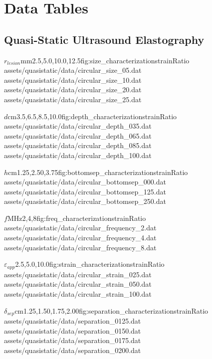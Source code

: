 \chapter{Data Tables}
\label{app:data_tables}
	\renewcommand{\arraystretch}{0.5}

	\section{Quasi-Static Ultrasound Elastography}
	\label{appsec:dt_quasi}
		\begin{multicols*}{2}
			\characterizationDataTable%
				{$r_{lesion}$}{mm}{2.5,5.0,10.0,12.5}{fig:size_characterization}{strainRatio}%
				{assets/quasistatic/data/circular_size_05.dat}%
				{assets/quasistatic/data/circular_size_10.dat}%
				{assets/quasistatic/data/circular_size_20.dat}%
				{assets/quasistatic/data/circular_size_25.dat}

			\characterizationDataTable%
				{$d$}{cm}{3.5,6.5,8.5,10.0}{fig:depth_characterization}{strainRatio}%
				{assets/quasistatic/data/circular_depth_035.dat}%
				{assets/quasistatic/data/circular_depth_065.dat}%
				{assets/quasistatic/data/circular_depth_085.dat}%
				{assets/quasistatic/data/circular_depth_100.dat}

			\characterizationDataTable%
				{$h$}{cm}{1.25,2.50,3.75}{fig:bottomsep_characterization}{strainRatio}%
				{assets/quasistatic/data/circular_bottomsep_000.dat}%
				{assets/quasistatic/data/circular_bottomsep_125.dat}%
				{assets/quasistatic/data/circular_bottomsep_250.dat}%
				{}

			\characterizationDataTable%
				{$f$}{MHz}{2,4,8}{fig:freq_characterization}{strainRatio}%
				{assets/quasistatic/data/circular_frequency_2.dat}%
				{assets/quasistatic/data/circular_frequency_4.dat}%
				{assets/quasistatic/data/circular_frequency_8.dat}%
				{}

			\characterizationDataTable%
				{$\varepsilon_{app}$}{\percent}{2.5,5.0,10.0}{fig:strain_characterization}{strainRatio}%
				{assets/quasistatic/data/circular_strain_025.dat}%
				{assets/quasistatic/data/circular_strain_050.dat}%
				{assets/quasistatic/data/circular_strain_100.dat}%
				{}

			\characterizationDataTable%
				{$\delta_{sep}$}{cm}{1.25,1.50,1.75,2.00}{fig:separation_characterization}{strainRatio}%
				{assets/quasistatic/data/separation_0125.dat}%
				{assets/quasistatic/data/separation_0150.dat}%
				{assets/quasistatic/data/separation_0175.dat}%
				{assets/quasistatic/data/separation_0200.dat}


\end{multicols*}
